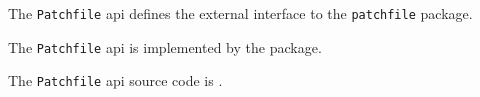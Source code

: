 The {\tt Patchfile} api defines the external interface to the {\tt patchfile} package.

The {\tt Patchfile} api is implemented by the  package.

The {\tt Patchfile} api source code is .
